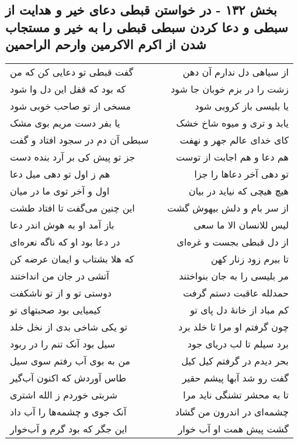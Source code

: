 \begin{center}
\section*{بخش ۱۳۲ - در خواستن قبطی دعای خیر و هدایت از سبطی و دعا کردن سبطی  قبطی را به خیر و مستجاب شدن از اکرم الاکرمین وارحم الراحمین}
\label{sec:sh132}
\begin{longtable}{l p{0.5cm} r}
گفت قبطی تو دعایی کن که من
&&
از سیاهی دل ندارم آن دهن
\\
که بود که قفل این دل وا شود
&&
زشت را در بزم خوبان جا شود
\\
مسخی از تو صاحب خوبی شود
&&
یا بلیسی باز کروبی شود
\\
یا بفر دست مریم بوی مشک
&&
یابد و تری و میوه شاخ خشک
\\
سبطی آن دم در سجود افتاد و گفت
&&
کای خدای عالم جهر و نهفت
\\
جز تو پیش کی بر آرد بنده دست
&&
هم دعا و هم اجابت از توست
\\
هم ز اول تو دهی میل دعا
&&
تو دهی آخر دعاها را جزا
\\
اول و آخر توی ما در میان
&&
هیچ هیچی که نیاید در بیان
\\
این چنین می‌گفت تا افتاد طشت
&&
از سر بام و دلش بیهوش گشت
\\
باز آمد او به هوش اندر دعا
&&
لیس للانسان الا ما سعی
\\
در دعا بود او که ناگه نعره‌ای
&&
از دل قبطی بجست و غره‌ای
\\
که هلا بشتاب و ایمان عرضه کن
&&
تا ببرم زود زنار کهن
\\
آتشی در جان من انداختند
&&
مر بلیسی را به جان بنواختند
\\
دوستی تو و از تو ناشکفت
&&
حمدلله عاقبت دستم گرفت
\\
کیمیایی بود صحبتهای تو
&&
کم مباد از خانهٔ دل پای تو
\\
تو یکی شاخی بدی از نخل خلد
&&
چون گرفتم او مرا تا خلد برد
\\
سیل بود آنک تنم را در ربود
&&
برد سیلم تا لب دریای جود
\\
من به بوی آب رفتم سوی سیل
&&
بحر دیدم در گرفتم کیل کیل
\\
طاس آوردش که اکنون آب‌گیر
&&
گفت رو شد آبها پیشم حقیر
\\
شربتی خوردم ز الله اشتری
&&
تا به محشر تشنگی ناید مرا
\\
آنک جوی و چشمه‌ها را آب داد
&&
چشمه‌ای در اندرون من گشاد
\\
این جگر که بود گرم و آب‌خوار
&&
گشت پیش همت او آب خوار

\end{longtable}
\end{center}
